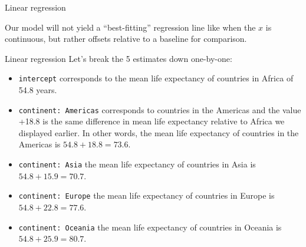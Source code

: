 \documentclass[
  ignorenonframetext,
]{beamer}
\begin{document}
\begin{frame}[fragile]{Linear regression}
\normalsize

Our model will not yield a ``best-fitting'' regression line like when
the \(x\) is continuous, but rather offsets relative to a baseline for
comparison.
\end{frame}

\begin{frame}[fragile]{Linear regression}
\protect\hypertarget{linear-regression-1}{}
Let's break the 5 estimates down one-by-one:

\begin{itemize}
\item
  \texttt{intercept} corresponds to the mean life expectancy of
  countries in Africa of 54.8 years.
\item
  \texttt{continent:\ Americas} corresponds to countries in the Americas
  and the value +18.8 is the same difference in mean life expectancy
  relative to Africa we displayed earlier. In other words, the mean life
  expectancy of countries in the Americas is \(54.8+18.8=73.6\).
\item
  \texttt{continent:\ Asia} the mean life expectancy of countries in
  Asia is \(54.8+ 15.9=70.7\).
\item
  \texttt{continent:\ Europe} the mean life expectancy of countries in
  Europe is \(54.8+22.8=77.6\).
\item
  \texttt{continent:\ Oceania} the mean life expectancy of countries in
  Oceania is \(54.8+25.9=80.7\).
\end{itemize}
\end{frame}
\end{document}
